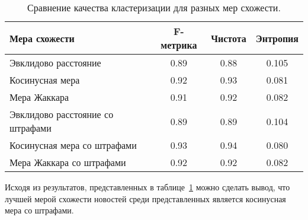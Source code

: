 \begin{table}[h]
    \centering
    \begin{tabular}{l | c | c | c}
        \hline
        Мера схожести & F-метрика & Чистота & Энтропия \\ \hline\hline
        Эвклидово расстояние             & 0.89 & 0.88 & 0.105  \\ \hline
        Косинусная мера                  & 0.92 & 0.93 & 0.081  \\ \hline
        Мера Жаккара                     & 0.91 & 0.92 & 0.082  \\ \hline
        Эвклидово расстояние со штрафами & 0.89 & 0.89 & 0.104  \\ \hline
        Косинусная мера со штрафами      & 0.93 & 0.94 & 0.080  \\ \hline
        Мера Жаккара со штрафами         & 0.92 & 0.92 & 0.082  \\
        \hline
    \end{tabular}
    \caption{Сравнение качества кластеризации для разных мер схожести.}
    \label{tbl:sim-quality}
\end{table}

Исходя из результатов, представленных в таблице~\ref{tbl:sim-quality} можно сделать вывод, что лучшей мерой схожести новостей среди представленных является косинусная мера со штрафами.
